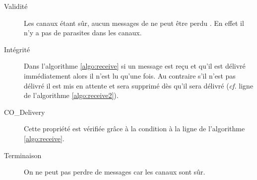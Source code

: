 \begin{description}
\item[Validité] Les canaux étant sûr, aucun messages de ne peut être \og perdu \fg{}. En effet il n'y a pas de parasites dans les canaux.
\item[Intégrité] Dans l'algorithme \ref{algo:receive} si un message est reçu et qu'il est délivré immédiatement alors il n'est lu qu'une fois. Au contraire s'il n'est pas délivré il est mis en attente et sera supprimé dès qu'il sera délivré (\emph{cf.} ligne de l'algorithme \ref{algo:receive2}).
\item[CO\_Delivery] Cette propriété est vérifiée grâce à la condition à la ligne de l'algorithme \ref{algo:receive}.
\item[Terminaison] On ne peut pas perdre de messages car les canaux sont sûr.
\end{description}







